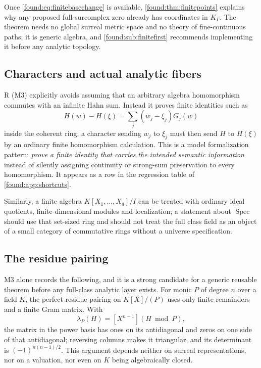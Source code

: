 \documentclass[11pt,letterpaper]{article}
\numberwithin{equation}{section}
\theoremstyle{definition}
\theoremstyle{remark}
\newcommand{\Spec}{\operatorname{Spec}}
\begin{document}
Once \eqref{found:eq:finitebasechange} is available,
\cref{found:thm:finitepoints} explains why any proposed full-surcomplex zero
already has coordinates in $K_\Gamma$. The theorem needs no global surreal
metric space and no theory of fine-continuous paths; it is generic algebra, and
\cref{found:sub:finitefirst} recommends implementing it before any analytic
topology.

\subsection{Characters and actual analytic fibers}
\label{found:sub:characters}
R (M3) explicitly avoids assuming that an arbitrary algebra homomorphism
commutes with an infinite Hahn sum. Instead it proves finite identities such as
\begin{equation}\label{found:eq:divideddifference}
 H(w)-H(\xi)=\sum_j(w_j-\xi_j)G_j(w)
\end{equation}
inside the coherent ring; a character sending $w_j$ to $\xi_j$ must then send
$H$ to $H(\xi)$ by an ordinary finite homomorphism calculation. This is a model
formalization pattern: \emph{prove a finite identity that carries the intended
semantic information} instead of silently assigning continuity or strong-sum
preservation to every homomorphism. It appears as a row in the regression table
of \cref{found:app:shortcuts}.

Similarly, a finite algebra $K[X_1,\ldots,X_d]/I$ can be treated with ordinary
ideal quotients, finite-dimensional modules and localization; a statement about
$\Spec$ should use that set-sized ring and should not treat the full class field
as an object of a small category of commutative rings without a universe
specification.

\subsection{The residue pairing}
\label{found:sub:residue}
M3 alone records the following, and it is a strong candidate for a generic
reusable theorem before any full-class analytic layer exists. For monic $P$ of
degree $n$ over a field $K$, the perfect residue pairing on $K[X]/(P)$ uses only
finite remainders and a finite Gram matrix. With
\begin{equation}\label{found:eq:residue}
 \lambda_P(H)=[X^{n-1}](H\bmod P),
\end{equation}
the matrix in the power basis has ones on its antidiagonal and zeros on one side
of that antidiagonal; reversing columns makes it triangular, and its determinant
is $(-1)^{n(n-1)/2}$. This argument depends neither on surreal representations,
nor on a valuation, nor even on $K$ being algebraically closed.
\end{document}
